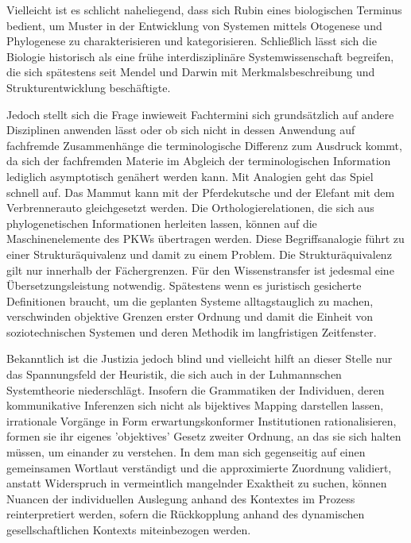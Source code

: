 \documentclass[a4paper,11pt]{article}
\begin{document}
Vielleicht ist es schlicht naheliegend, dass sich Rubin eines biologischen Terminus bedient, um Muster in der
Entwicklung von Systemen mittels Otogenese und Phylogenese zu charakterisieren und kategorisieren. Schließlich
lässt sich die Biologie historisch als eine frühe interdisziplinäre Systemwissenschaft begreifen, die sich
spätestens seit Mendel und Darwin mit Merkmalsbeschreibung und Strukturentwicklung beschäftigte.


Jedoch stellt sich die Frage inwieweit Fachtermini sich grundsätzlich auf andere Disziplinen anwenden lässt oder ob
sich nicht in dessen Anwendung auf fachfremde Zusammenhänge die terminologische Differenz zum Ausdruck kommt, da
sich der fachfremden Materie im Abgleich der terminologischen Information lediglich asymptotisch genähert werden
kann. Mit Analogien geht das Spiel schnell auf. Das Mammut kann mit der Pferdekutsche und der Elefant mit dem
Verbrennerauto gleichgesetzt werden. Die Orthologierelationen, die sich aus phylogenetischen Informationen
herleiten lassen, können auf die
Maschinenelemente des PKWs übertragen werden. Diese Begriffsanalogie führt zu einer Strukturäquivalenz und damit zu
einem Problem. Die Strukturäquivalenz gilt nur innerhalb der Fächergrenzen. Für den Wissenstransfer ist jedesmal
eine Übersetzungsleistung notwendig. Spätestens wenn es juristisch gesicherte Definitionen braucht, um die
geplanten Systeme alltagstauglich zu machen, verschwinden objektive Grenzen erster Ordnung 
und damit die Einheit von soziotechnischen Systemen und deren Methodik im langfristigen Zeitfenster. 


Bekanntlich ist die Justizia jedoch blind und vielleicht hilft an dieser Stelle nur das Spannungsfeld der
Heuristik, die sich auch in der Luhmannschen Systemtheorie niederschlägt. Insofern die Grammatiken der Individuen,
deren kommunikative Inferenzen sich nicht als bijektives Mapping darstellen lassen, irrationale Vorgänge in Form
erwartungskonformer Institutionen rationalisieren, formen sie ihr eigenes 'objektives' Gesetz zweiter Ordnung, an
das sie sich halten müssen, um einander zu verstehen. In dem man sich gegenseitig auf einen gemeinsamen
Wortlaut verständigt und die approximierte Zuordnung validiert, anstatt Widerspruch in vermeintlich mangelnder
Exaktheit zu suchen, können Nuancen der individuellen Auslegung anhand des Kontextes im Prozess reinterpretiert
werden, sofern die Rückkopplung anhand des dynamischen gesellschaftlichen Kontexts miteinbezogen werden.
\end{document}
